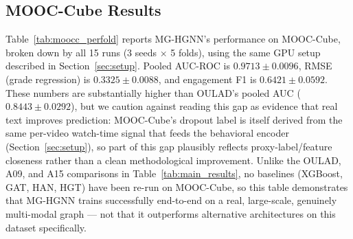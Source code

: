 \documentclass[sigconf,review]{acmart}
\begin{document}
\subsection{MOOC-Cube Results}
\label{sec:moocc}

Table~\ref{tab:moocc_perfold} reports MG-HGNN's
performance on MOOC-Cube, broken down by all 15 runs
(3 seeds $\times$ 5 folds), using the same GPU setup
described in Section~\ref{sec:setup}. Pooled AUC-ROC
is $0.9713 \pm 0.0096$, RMSE (grade regression) is
$0.3325 \pm 0.0088$, and engagement F1 is
$0.6421 \pm 0.0592$. These numbers are substantially
higher than OULAD's pooled AUC ($0.8443 \pm 0.0292$),
but we caution against reading this gap as evidence
that real text improves prediction: MOOC-Cube's dropout
label is itself derived from the same per-video
watch-time signal that feeds the behavioral encoder
(Section~\ref{sec:setup}), so part of this gap plausibly
reflects proxy-label/feature closeness rather than a
clean methodological improvement. Unlike the OULAD,
A09, and A15 comparisons in Table~\ref{tab:main_results},
no baselines (XGBoost, GAT, HAN, HGT) have been re-run
on MOOC-Cube, so this table demonstrates that MG-HGNN
trains successfully end-to-end on a real, large-scale,
genuinely multi-modal graph --- not that it outperforms
alternative architectures on this dataset specifically.
\end{document}
